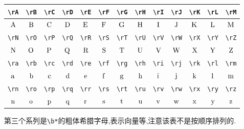 \documentclass[lang=cn,12pt,scheme=chinese,mode=simple,black]{elegantbook}
\begin{document}
\begin{center}
    \renewcommand{\arraystretch}{1.4}
    \setlength{\tabcolsep}{6pt}
    \begin{tabular}{|c|c|c|c|c|c|c|c|c|c|c|c|c|}
        \hline\hline
        \verb|\rA| & \verb|\rB| & \verb|\rC| & \verb|\rD| & \verb|\rE| & \verb|\rF| & \verb|\rG| & \verb|\rH| & \verb|\rI| & \verb|\rJ| & \verb|\rK| & \verb|\rL| & \verb|\rM| \\
        \hline
        $\rA$      & $\rB$      & $\rC$      & $\rD$      & $\rE$      & $\rF$      & $\rG$      & $\rH$      & $\rI$      & $\rJ$      & $\rK$      & $\rL$      & $\rM$      \\
        \hline\hline
        \verb|\rN| & \verb|\rO| & \verb|\rP| & \verb|\rQ| & \verb|\rR| & \verb|\rS| & \verb|\rT| & \verb|\rU| & \verb|\rV| & \verb|\rW| & \verb|\rX| & \verb|\rY| & \verb|\rZ| \\
        \hline
        $\rN$      & $\rO$      & $\rP$      & $\rQ$      & $\rR$      & $\rS$      & $\rT$      & $\rU$      & $\rV$      & $\rW$      & $\rX$      & $\rY$      & $\rZ$      \\
        \hline\hline
        \verb|\ra| & \verb|\rb| & \verb|\rc| & \verb|\rd| & \verb|\re| & \verb|\rf| & \verb|\rg| & \verb|\rh| & \verb|\ri| & \verb|\rj| & \verb|\rk| & \verb|\rl| & \verb|\rm| \\
        \hline
        $\ra$      & $\rb$      & $\rc$      & $\rd$      & $\re$      & $\rf$      & $\rg$      & $\rh$      & $\ri$      & $\rj$      & $\rk$      & $\rl$      & $\rm$      \\
        \hline\hline
        \verb|\rn| & \verb|\ro| & \verb|\rp| & \verb|\rq| & \verb|\rr| & \verb|\rs| & \verb|\rt| & \verb|\ru| & \verb|\rv| & \verb|\rw| & \verb|\rx| & \verb|\ry| & \verb|\rz| \\
        \hline
        $\rn$      & $\ro$      & $\rp$      & $\rq$      & $\rr$      & $\rs$      & $\rt$      & $\ru$      & $\rv$      & $\rw$      & $\rx$      & $\ry$      & $\rz$      \\
        \hline\hline
    \end{tabular}
\end{center}

\vspace{1cm}
\newpage
第三个系列是\verb|\b*|的粗体希腊字母,表示向量等,注意该表不是按顺序排列的.
\end{document}
